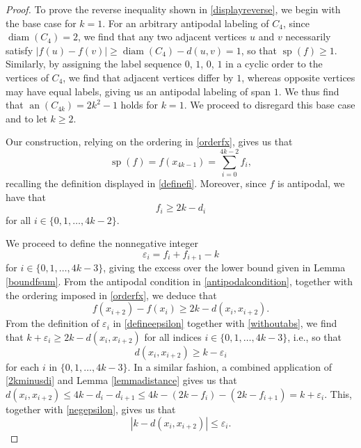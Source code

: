\documentclass[10pt,a4paper]{amsart}
\begin{document}
\begin{proof}
 To prove the reverse inequality shown in \eqref{displayreverse}, we begin with the base case for $ k = 1$. For an arbitrary antipodal 
 labeling of $C_{4}$, since $\operatorname{diam}(C_4) = 2$, we find that any two adjacent vertices $u$ and $v$ necessarily satisfy $| f(u) - 
 f(v) | \geq \operatorname{diam}(C_4) - d(u, v) = 1$, 
 so that $\operatorname{sp}(f) \geq 1$. 
 Similarly, by assigning the label sequence $0$, $1$, $0$, $1$
 in a cyclic order to the vertices of $C_{4}$, we find that adjacent vertices differ by $1$, whereas opposite vertices
 may have equal labels, giving us an antipodal labeling of span $1$. 
 We thus find that $\operatorname{an}(C_{4k}) = 2k^2 - 1$ holds for $k = 1$. 
 We proceed to disregard this base case and to let $k \geq 2$. 

 Our construction, relying on the ordering in \eqref{orderfx}, gives us that 
\begin{equation}\label{evaluatespf} 
 \operatorname{sp}(f) = f(x_{4k-1}) = \sum_{i=0}^{4k-2} f_{i}, 
\end{equation} 
 recalling the definition displayed in \eqref{definefi}. 
 Moreover, since $f$ is antipodal, we have that 
\begin{equation}\label{2kminusdi} 
 f_{i} \geq 2 k - d_i 
\end{equation}
 for all $i \in \{ 0, 1, \ldots, 4k - 2 \}$. 

 We proceed to define the nonnegative integer
\begin{equation}\label{defineepsilon} 
 \varepsilon_{i} = f_{i} + f_{i+1} - k 
\end{equation}
 for $i \in \{ 0, 1, \ldots, 4k-3 \}$, giving the excess over the lower bound given in Lemma \ref{boundfsum}. From the antipodal condition in 
 \eqref{antipodalcondition}, together with 
 the ordering imposed in \eqref{orderfx}, 
 we deduce that 
\begin{equation}\label{withoutabs}
 f(x_{i + 2}) - f(x_{i}) \geq 2 k - d(x_i, x_{i+2}). 
\end{equation}
 From the definition of $\varepsilon_i$ in \eqref{defineepsilon} together
 with \eqref{withoutabs}, we find that 
 $ k + \varepsilon_i \geq 2 k - d(x_i, x_{i+2}) $
 for all indices $i \in \{ 0, 1, \ldots, 4 k - 3 \}$, 
 i.e., so that 
\begin{equation}\label{negepsilon} 
 d(x_{i}, x_{i+2}) \geq k - \varepsilon_{i} 
\end{equation}
 for each $i$ in $ \{ 0, 1, \ldots, 4 k - 3 \}$. 
 In a similar fashion, a combined application of \eqref{2kminusdi}
 and Lemma \ref{lemmadistance} gives us that $ d(x_{i}, x_{i+2}) \leq 4 k - d_i - d_{i+1} \leq 4 k - (2 k - f_i) - 
 (2 k - f_{i+1}) = k +\varepsilon_i$. This, together with \eqref{negepsilon}, gives us that 
\begin{equation}\label{boundabs} 
 \left| k - d(x_i, x_{i+2}) \right| \leq \varepsilon_i. 
\end{equation}


\end{proof}
\end{document}

